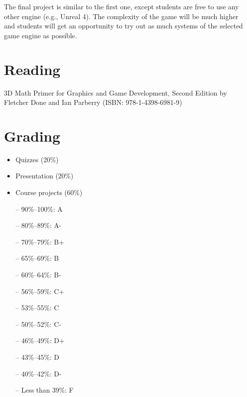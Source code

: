 \documentclass[12pt,a4paper,oneside]{article}
\begin{document}
        The final project is similar to the first one, except students are free
        to use any other engine (e.g., Unreal 4). The complexity of the game
        will be much higher and students will get an opportunity to try out as
        much systems of the selected game engine as possible.

    \section{Reading}

        3D Math Primer for Graphics and Game Development, Second Edition by
        Fletcher Done and Ian Parberry (ISBN: 978-1-4398-6981-9)

    \section{Grading}

        \begin{itemize}
            \item Quizzes (20\%)
            \item Presentation (20\%)
            \item Course projects (60\%)
        \end{itemize}

        \begin{itemize} \itemsep-10pt \parskip0pt 
            \item[--] 90\%--100\%: A\\
            \item[--] 80\%--89\%: A-\\
            \item[--] 70\%--79\%: B+\\
            \item[--] 65\%--69\%: B\\
            \item[--] 60\%--64\%: B-\\
            \item[--] 56\%--59\%: C+\\
            \item[--] 53\%--55\%: C\\
            \item[--] 50\%--52\%: C-\\
            \item[--] 46\%--49\%: D+\\
            \item[--] 43\%--45\%: D\\
            \item[--] 40\%--42\%: D-\\
            \item[--] Less than 39\%: F
        \end{itemize}
\end{document}
